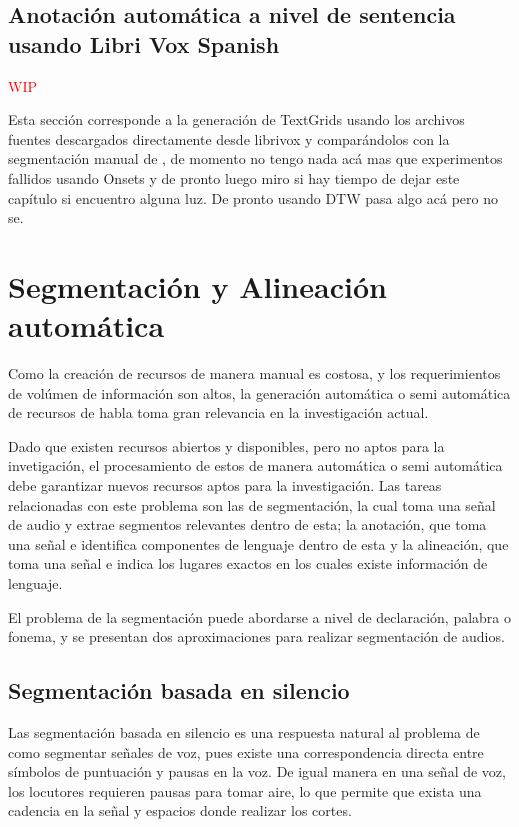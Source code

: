 \documentclass[a4paper,12pt,twoside]{report}
\begin{document}



\section{Anotación automática a nivel de sentencia usando Libri Vox Spanish}

\textcolor{red}{WIP}

Esta sección corresponde a la generación de TextGrids usando los archivos fuentes descargados directamente desde librivox y comparándolos con la segmentación manual de \cite{LibriVox-Spanish}, de momento no tengo nada acá mas que experimentos fallidos usando Onsets y de pronto luego miro si hay tiempo de dejar este capítulo si encuentro alguna luz. De pronto usando DTW pasa algo acá pero no se.



\chapter{Segmentación y Alineación automática}

Como la creación de recursos de manera manual es costosa, y los requerimientos de volúmen de información son altos, la generación automática o semi automática de recursos de habla toma gran relevancia en la investigación actual.

Dado que existen recursos abiertos y disponibles, pero no aptos para la invetigación, el procesamiento de estos de manera automática o semi automática debe garantizar nuevos recursos aptos para la investigación. Las tareas relacionadas con este problema son las de segmentación, la cual toma una señal de audio y extrae segmentos relevantes dentro de esta; la anotación, que toma una señal e identifica componentes de lenguaje dentro de esta y la alineación, que toma una señal e indica los lugares exactos en los cuales existe información de lenguaje.

El problema de la segmentación puede abordarse a nivel de declaración, palabra o fonema, y se presentan dos aproximaciones para realizar segmentación de audios.

\section{Segmentación basada en silencio}

Las segmentación basada en silencio es una respuesta natural al problema de como segmentar señales de voz, pues existe una correspondencia directa entre símbolos de puntuación y pausas en la voz. De igual manera en una señal de voz, los locutores requieren pausas para tomar aire, lo que permite que exista una cadencia en la señal y espacios donde realizar los cortes.
\end{document}
